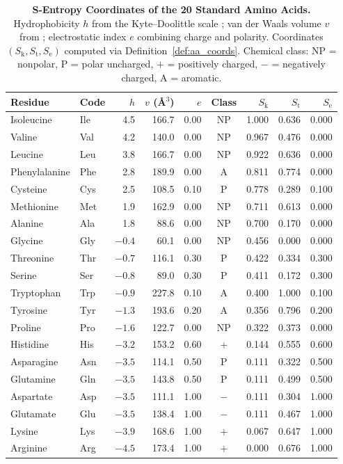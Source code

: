 \documentclass[11pt,twocolumn,a4paper]{article}
\theoremstyle{definition}
\theoremstyle{remark}
\newcommand{\Sk}{S_{\mathrm{k}}}
\newcommand{\St}{S_{\mathrm{t}}}
\newcommand{\Se}{S_{\mathrm{e}}}
\begin{document}
\begin{table}[!htbp]
\centering
\caption{\textbf{S-Entropy Coordinates of the 20 Standard Amino Acids.} Hydrophobicity $h$ from the Kyte--Doolittle scale \citep{kyte1982}; van der Waals volume $v$ from \citet{creighton1993}; electrostatic index $e$ combining charge and polarity. Coordinates $(\Sk, \St, \Se)$ computed via Definition~\ref{def:aa_coords}. Chemical class: NP = nonpolar, P = polar uncharged, $+$ = positively charged, $-$ = negatively charged, A = aromatic.}
\label{tab:amino_acids}
\small
\begin{tabular}{@{}llrrrcrrr@{}}
\toprule
Residue & Code & $h$ & $v$ (\AA$^3$) & $e$ & Class & $\Sk$ & $\St$ & $\Se$ \\
\midrule
Isoleucine  & Ile & 4.5  & 166.7 & 0.00 & NP & 1.000 & 0.636 & 0.000 \\
Valine      & Val & 4.2  & 140.0 & 0.00 & NP & 0.967 & 0.476 & 0.000 \\
Leucine     & Leu & 3.8  & 166.7 & 0.00 & NP & 0.922 & 0.636 & 0.000 \\
Phenylalanine & Phe & 2.8 & 189.9 & 0.00 & A & 0.811 & 0.774 & 0.000 \\
Cysteine    & Cys & 2.5  & 108.5 & 0.10 & P  & 0.778 & 0.289 & 0.100 \\
Methionine  & Met & 1.9  & 162.9 & 0.00 & NP & 0.711 & 0.613 & 0.000 \\
Alanine     & Ala & 1.8  & 88.6  & 0.00 & NP & 0.700 & 0.170 & 0.000 \\
Glycine     & Gly & $-0.4$ & 60.1 & 0.00 & NP & 0.456 & 0.000 & 0.000 \\
Threonine   & Thr & $-0.7$ & 116.1 & 0.30 & P  & 0.422 & 0.334 & 0.300 \\
Serine      & Ser & $-0.8$ & 89.0  & 0.30 & P  & 0.411 & 0.172 & 0.300 \\
Tryptophan  & Trp & $-0.9$ & 227.8 & 0.10 & A  & 0.400 & 1.000 & 0.100 \\
Tyrosine    & Tyr & $-1.3$ & 193.6 & 0.20 & A  & 0.356 & 0.796 & 0.200 \\
Proline     & Pro & $-1.6$ & 122.7 & 0.00 & NP & 0.322 & 0.373 & 0.000 \\
Histidine   & His & $-3.2$ & 153.2 & 0.60 & $+$& 0.144 & 0.555 & 0.600 \\
Asparagine  & Asn & $-3.5$ & 114.1 & 0.50 & P  & 0.111 & 0.322 & 0.500 \\
Glutamine   & Gln & $-3.5$ & 143.8 & 0.50 & P  & 0.111 & 0.499 & 0.500 \\
Aspartate   & Asp & $-3.5$ & 111.1 & 1.00 & $-$& 0.111 & 0.304 & 1.000 \\
Glutamate   & Glu & $-3.5$ & 138.4 & 1.00 & $-$& 0.111 & 0.467 & 1.000 \\
Lysine      & Lys & $-3.9$ & 168.6 & 1.00 & $+$& 0.067 & 0.647 & 1.000 \\
Arginine    & Arg & $-4.5$ & 173.4 & 1.00 & $+$& 0.000 & 0.676 & 1.000 \\
\bottomrule
\end{tabular}
\end{table}
\end{document}
